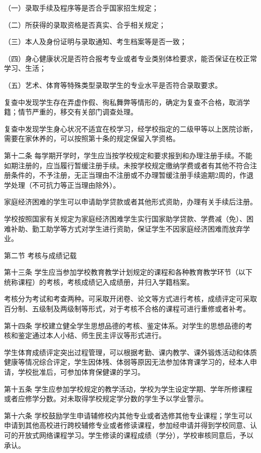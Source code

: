 \documentclass[UTF8,12pt,a4paper]{report}
\begin{document}
（一）录取手续及程序等是否合乎国家招生规定；

（二）所获得的录取资格是否真实、合乎相关规定；

（三）本人及身份证明与录取通知、考生档案等是否一致；

（四）身心健康状况是否符合报考专业或者专业类别体检要求，能否保证在校正常学习、生活；

（五）艺术、体育等特殊类型录取学生的专业水平是否符合录取要求。

复查中发现学生存在弄虚作假、徇私舞弊等情形的，确定为复查不合格，取消学籍；情节严重的，移交有关部门调查处理。

复查中发现学生身心状况不适宜在校学习，经学校指定的二级甲等以上医院诊断，需要在家休养的，可以按照第十条的规定保留入学资格。

第十二条 每学期开学时，学生应当按学校规定和要求报到和办理注册手续。不能如期注册的，应当履行暂缓注册手续。未按学校规定缴纳学费或者有其他不符合注册条件的，不予注册，无正当理由不注册或不办理暂缓注册手续逾期2周的，作退学处理（不可抗力等正当理由除外）。

家庭经济困难的学生可以申请助学贷款或者其他形式资助，办理有关手续后注册。

学校按照国家有关规定为家庭经济困难学生实行国家助学贷款、学费减（免）、困难补助、勤工助学等方式对学生进行资助，保证学生不因家庭经济困难而放弃学业。

第二节 考核与成绩记载

第十三条 学生应当参加学校教育教学计划规定的课程和各种教育教学环节（以下统称课程）的考核，考核成绩记入成绩册，并归入学籍档案。　　

考核分为考试和考查两种。可采取开闭卷、论文等方式进行考核，成绩评定可采取百分制、五级制及两级制等形式，对于考核不合格的课程可进行重修或者补考。

第十四条 学校建立健全学生思想品德的考核、鉴定体系。对学生的思想品德的考核和鉴定通过本人小结、师生民主评议等形式进行。

学生体育成绩评定突出过程管理，可以根据考勤、课内教学、课外锻炼活动和体质健康等情况综合评定，学生因体残、体弱等原因无法参加体育课学习的，经本人申请，学校批准后，可参加体育保健课的学习。

第十五条 学生应参加学校规定的教学活动，学校为学生设定学期、学年所修课程或者应修学分数。对未取得学校规定学分数的学生予以学业警示。

第十六条 学校鼓励学生申请辅修校内其他专业或者选修其他专业课程；学生可以申请到其他高校进行跨校辅修专业或者修读课程，参加经申请并得到学校同意、认可的开放式网络课程学习。学生修读的课程成绩（学分），学校审核同意后，予以承认。
\end{document}
